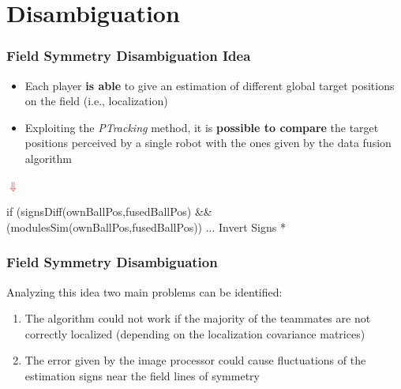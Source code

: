 \section{Disambiguation}

\begin{frame}[fragile]
	\frametitle{Field Symmetry Disambiguation Idea}
	
	\Large
	
	\vspace{0.3cm}
	
	\begin{itemize}
		\item Each player \textbf{is able} to give an estimation of different global target
			  positions on the field (i.e., localization)
		\vspace{0.2cm}
		\item Exploiting the \emph{PTracking} method, it is \textbf{possible to compare} the
			  target positions perceived by a single robot with the ones given by the data
			  fusion algorithm
	\end{itemize}
	
	\vspace{-0.4cm}
	
	\begin{center}
		\Huge
		
		\textcolor{red}{\textbf{$ \Downarrow $}}
	\end{center}
	
	\vspace{-0.2cm}
	
	\begin{verbbox}
		if (signsDiff(ownBallPos,fusedBallPos) &&
		   (modulesSim(ownBallPos,fusedBallPos)) {
   ... \* Invert Signs *\
		}
	\end{verbbox}
	
	\begin{figure}[!H]
		\centering
		\theverbbox
	\end{figure}
\end{frame}

\begin{frame}
	\frametitle{Field Symmetry Disambiguation}
	
	\Large
	
	Analyzing this idea two main problems can be identified:
	
	\begin{enumerate}
		\item The algorithm could not work if the majority of the teammates are not correctly
			  localized (depending on the localization covariance matrices)
		\vspace{0.2cm}
		\item The error given by the image processor could cause fluctuations of the estimation
			  signs near the field lines of symmetry
	\end{enumerate}
\end{frame}


